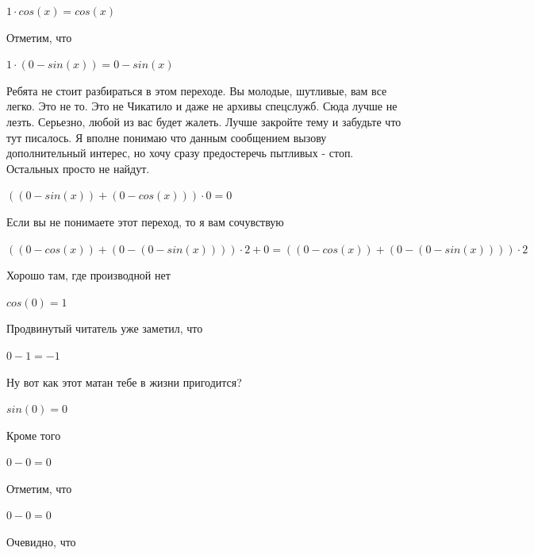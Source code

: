 \documentclass[12pt,a4paper,fleqn]{article}
\begin{document}
\begin{center}
$1 \cdot cos(x) = cos(x)$\end{center}
Отметим, что

\begin{center}
$1 \cdot (0-sin(x)) = 0-sin(x)$\end{center}
Ребята не стоит разбираться в этом переходе. Вы молодые, шутливые, вам все легко. Это не то. Это не Чикатило и даже не архивы спецслужб. Сюда лучше не лезть. Серьезно, любой из вас будет жалеть. Лучше закройте тему и забудьте что тут писалось. Я вполне понимаю что данным сообщением вызову дополнительный интерес, но хочу сразу предостеречь пытливых - стоп. Остальных просто не найдут.

\begin{center}
$((0-sin(x))+(0-cos(x))) \cdot 0 = 0$\end{center}
Если вы не понимаете этот переход, то я вам сочувствую

\begin{center}
$((0-cos(x))+(0-(0-sin(x)))) \cdot 2+0 = ((0-cos(x))+(0-(0-sin(x)))) \cdot 2$\end{center}
Хорошо там, где производной нет\cite{link2}

\begin{center}
\end{center}
\begin{center}$cos(0) = 1$\end{center}
Продвинутый читатель уже заметил, что

\begin{center}
\end{center}
\begin{center}$0-1 = -1$\end{center}
Ну вот как этот матан тебе в жизни пригодится?

\begin{center}
\end{center}
\begin{center}$sin(0) = 0$\end{center}
Кроме того

\begin{center}
\end{center}
\begin{center}$0-0 = 0$\end{center}
Отметим, что

\begin{center}
\end{center}
\begin{center}$0-0 = 0$\end{center}
Очевидно, что
\end{document}
